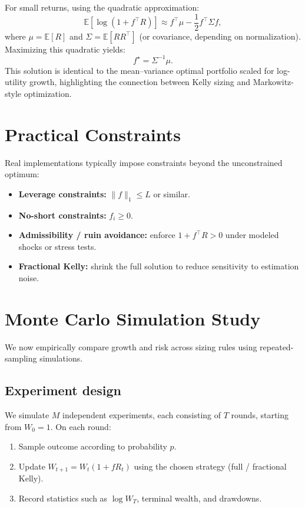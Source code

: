 \documentclass[11pt]{article}
\theoremstyle{plain}
\theoremstyle{definition}
\theoremstyle{remark}
\newcommand{\E}{\mathbb{E}}
\newcommand{\1}{\mathbf{1}}
\begin{document}
For small returns, using the quadratic approximation:
\[
\E[\log(1+f^\top R)] \approx f^\top \mu - \frac{1}{2} f^\top \Sigma f,
\]
where $\mu=\E[R]$ and $\Sigma=\E[RR^\top]$ (or covariance, depending on normalization). Maximizing this quadratic yields:
\begin{equation}
f^\star = \Sigma^{-1}\mu.
\label{eq:kelly_multi}
\end{equation}
\noindent
This solution is identical to the mean--variance optimal portfolio scaled for log-utility growth, highlighting the connection between Kelly sizing and Markowitz-style optimization.

\section{Practical Constraints}
Real implementations typically impose constraints beyond the unconstrained optimum:
\begin{itemize}
\item \textbf{Leverage constraints:} $\|f\|_1\le L$ or similar.
\item \textbf{No-short constraints:} $f_i\ge 0$.
\item \textbf{Admissibility / ruin avoidance:} enforce $1+f^\top R>0$ under modeled shocks or stress tests.
\item \textbf{Fractional Kelly:} shrink the full solution to reduce sensitivity to estimation noise.
\end{itemize}

\section{Monte Carlo Simulation Study}
We now empirically compare growth and risk across sizing rules using repeated-sampling simulations.

\subsection{Experiment design}
We simulate $M$ independent experiments, each consisting of $T$ rounds, starting from $W_0=1$. On each round:
\begin{enumerate}[label=\arabic*.]
\item Sample outcome according to probability $p$.
\item Update $W_{t+1}=W_t(1+fR_t)$ using the chosen strategy (full / fractional Kelly).
\item Record statistics such as $\log W_T$, terminal wealth, and drawdowns.
\end{enumerate}
\end{document}
